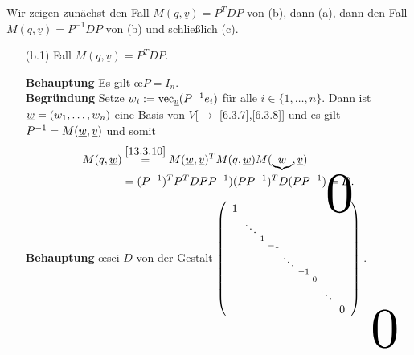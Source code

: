 \documentclass[../../main.tex]{subfiles}
\begin{document}
\begin{cproof}
    Wir zeigen zunächst den Fall $M(q,\underline{v})=P^T{DP}$ von (b), dann (a), dann den Fall $M(q,\underline{v})=P^{-1}DP$ von (b) und schließlich (c).\\
    \begin{itemize}
        \item[(b.1)] Fall $M(q,\underline{v})=P^T{DP}$. 
        \begin{behbox}
            \textbf{Behauptung} 
                Es gilt \oe $P=I_n$. \\
            \textbf{Begründung} 
                Setze $w_i:=\operatorname{vec}_{{\underline v}}(P^{-1}e_i)$ für alle $i\in\{1,\ldots ,n\}$. Dann ist ${\underline w}=(w_1,\ldots ,w_n)$ eine Basis von $V$[$\to$ \ref{6.3.7},\ref{6.3.8}] und es gilt $P^{-1}=M({\underline w},{\underline v})$ und somit 
                \begin{align*}
                    M(q,\underline{w})&\stackrel{\ref{13.3.10}}{=}M(\underline{w},\underline{v})^TM(q,\underline{w})M(\underbrace{w},\underline{v})\\
                    &=(P^{-1})^TP^TDPP^{-1})(PP^{-1})^TD(PP^{-1})=D.
                \end{align*}
        \end{behbox}
        \begin{behbox}
            \textbf{Behauptung} 
                \oe sei $D$ von der Gestalt 
                $\left(
                    \begin{smallmatrix}
                        \tikz\node(c){$1$};\\
                        &\ddots\\
                        &&1\\
                        &&&-1\\
                        &&&&\ddots\\
                        &&&&&-1\\
                        &&&&&&0\\
                        &&&&&&&\ddots\\
                        &&&&&&&&\tikz\node(d){$0$};
                    \end{smallmatrix}
                \right)
                \begin{tikzpicture}[overlay]
                    \node[below right of = c,xshift=0em,yshift=-4em,scale=5]{$0$};
                    \node[above left of = d,xshift=0em,yshift=4em,scale=5]{$0$};
                \end{tikzpicture}$. \\

\end{behbox}
\end{itemize}
\end{cproof}
\end{document}
